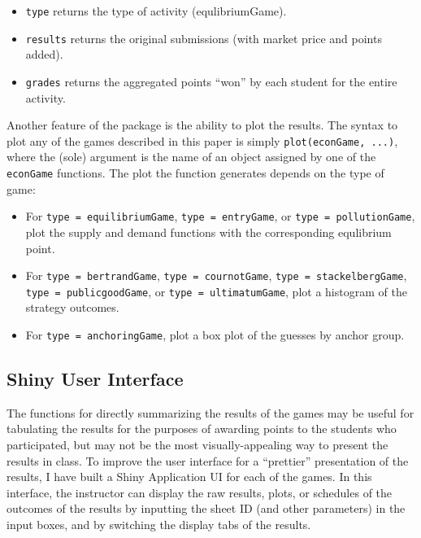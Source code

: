\documentclass[
]{article}
\providecommand{\tightlist}{%
  \setlength{\itemsep}{0pt}\setlength{\parskip}{0pt}}
\begin{document}
\begin{itemize}
\begin{itemize}
    \begin{itemize}
    \tightlist
    \item
      \texttt{type} returns the type of activity (equlibriumGame).
    \item
      \texttt{results} returns the original submissions (with market
      price and points added).
    \item
      \texttt{grades} returns the aggregated points ``won'' by each
      student for the entire activity.
    \end{itemize}
  \end{itemize}
\end{itemize}

Another feature of the package is the ability to plot the results. The
syntax to plot any of the games described in this paper is simply
\texttt{plot(econGame,\ ...)}, where the (sole) argument is the name of
an object assigned by one of the \texttt{econGame} functions. The plot
the function generates depends on the type of game:

\begin{itemize}
\tightlist
\item
  For
  \texttt{type\ =\ \textquotesingle{}equilibriumGame\textquotesingle{}},
  \texttt{type\ =\ \textquotesingle{}entryGame\textquotesingle{}}, or
  \texttt{type\ =\ \textquotesingle{}pollutionGame\textquotesingle{}},
  plot the supply and demand functions with the corresponding equlibrium
  point.
\item
  For
  \texttt{type\ =\ \textquotesingle{}bertrandGame\textquotesingle{}},
  \texttt{type\ =\ \textquotesingle{}cournotGame\textquotesingle{}},
  \texttt{type\ =\ \textquotesingle{}stackelbergGame\textquotesingle{}},
  \texttt{type\ =\ \textquotesingle{}publicgoodGame\textquotesingle{}},
  or
  \texttt{type\ =\ \textquotesingle{}ultimatumGame\textquotesingle{}},
  plot a histogram of the strategy outcomes.
\item
  For
  \texttt{type\ =\ \textquotesingle{}anchoringGame\textquotesingle{}},
  plot a box plot of the guesses by anchor group.
\end{itemize}

\hypertarget{shiny-user-interface}{%
\subsection{Shiny User Interface}\label{shiny-user-interface}}

The functions for directly summarizing the results of the games may be
useful for tabulating the results for the purposes of awarding points to
the students who participated, but may not be the most
visually-appealing way to present the results in class. To improve the
user interface for a ``prettier'' presentation of the results, I have
built a Shiny Application UI for each of the games. In this interface,
the instructor can display the raw results, plots, or schedules of the
outcomes of the results by inputting the sheet ID (and other parameters)
in the input boxes, and by switching the display tabs of the results.
\end{document}
